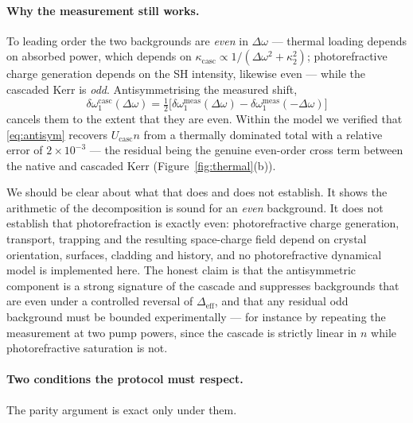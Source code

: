 \documentclass[11pt,a4paper]{article}
\newcommand{\Dom}{\Delta\omega}
\newcommand{\Ucasc}{U_{\text{casc}}}
\newcommand{\kcasc}{\kappa_{\text{casc}}}
\begin{document}
\paragraph{Why the measurement still works.}  To leading order the two
backgrounds are \emph{even} in $\Dom$ --- thermal loading depends on
absorbed power, which depends on $\kcasc\propto1/(\Dom^2+\kappa_2^2)$;
photorefractive charge generation depends on the SH intensity, likewise
even --- while the cascaded Kerr is \emph{odd}.  Antisymmetrising the
measured shift,
\begin{equation}
  \boxed{\;\delta\omega_1^{\text{casc}}(\Dom)
   =\tfrac12\bigl[\delta\omega_1^{\text{meas}}(\Dom)
                 -\delta\omega_1^{\text{meas}}(-\Dom)\bigr]\;}
  \label{eq:antisym}
\end{equation}
cancels them to the extent that they are even.  Within the model we
verified that \eqref{eq:antisym} recovers $\Ucasc n$ from a
thermally dominated total with a relative error of $2\times10^{-3}$ ---
the residual being the genuine even-order cross term between the native
and cascaded Kerr (Figure~\ref{fig:thermal}(b)).

We should be clear about what that does and does not establish.  It shows
the arithmetic of the decomposition is sound for an \emph{even}
background.  It does not establish that photorefraction is exactly even:
photorefractive charge generation, transport, trapping and the resulting
space-charge field depend on crystal orientation, surfaces, cladding and
history, and no photorefractive dynamical model is implemented here.  The
honest claim is that the antisymmetric component is a strong signature of
the cascade and suppresses backgrounds that are even under a controlled
reversal of $\Delta_{\text{eff}}$, and that any residual odd background
must be bounded experimentally --- for instance by repeating the
measurement at two pump powers, since the cascade is strictly linear in
$n$ while photorefractive saturation is not.

\paragraph{Two conditions the protocol must respect.}  The parity
argument is exact only under them.
\end{document}
